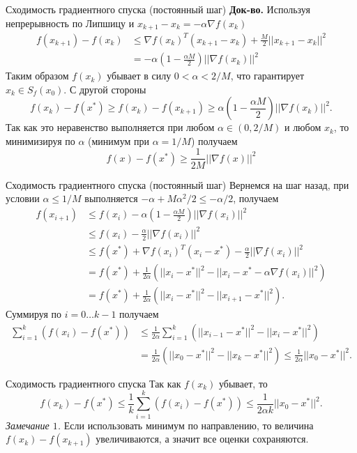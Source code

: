 \documentclass[10pt]{beamer}
\begin{document}
\begin{frame}{Сходимость градиентного спуска (постоянный шаг)}
\textbf{Док-во.} Используя непрерывность по Липшицу и $x_{k+1}-x_k=-\alpha \nabla f(x_k)$
\begin{align*}
f(x_{k+1})-f(x_k)&\leq \nabla f(x_k)^T(x_{k+1}-x_k)+\frac{M}{2}||x_{k+1}-x_k||^2\\
&=-\alpha\left(1-\frac{\alpha M}{2}\right)||\nabla f(x_k)||^2
\end{align*}
\pause
Таким образом $f(x_k)$ убывает в силу $0<\alpha<2/M$, что гарантирует $x_k\in S_f(x_0)$. \pause С другой стороны
$$
f(x_k)-f(x^*)\geq f(x_k)-f(x_{k+1})\geq \alpha\left(1-\frac{\alpha M}{2}\right)||\nabla f(x_k)||^2.
$$
Так как это неравенство выполняется при любом $\alpha\in(0, 2/M)$ и любом $x_k$, то минимизируя по $\alpha$ (минимум при $\alpha=1/M$) получаем
\begin{equation}\label{funcgeqgrad}
f(x)-f(x^*)\geq \frac{1}{2M}||\nabla f(x)||^2
\end{equation}
\end{frame}


\begin{frame}{Сходимость градиентного спуска (постоянный шаг)}
Вернемся на шаг назад, при условии $\alpha\leq 1/M$ выполняется $-\alpha+M\alpha^2/2\leq -\alpha/2$, получаем
\begin{align*}
f(x_{i+1}) & \leq f(x_i)-\alpha\left(1-\frac{\alpha M}{2}\right)||\nabla f(x_i)||^2 \\
& \leq f(x_i)-\frac{\alpha}{2}||\nabla f(x_i)||^2 \\
& \leq f(x^*)+\nabla f(x_i)^T(x_i-x^*)-\frac{\alpha}{2}||\nabla f(x_i)||^2 \\
& =f(x^*)+\frac{1}{2\alpha}\left(||x_i-x^*||^2-||x_i-x^*-\alpha \nabla f(x_i)||^2\right) \\
&=
f(x^*)+\frac{1}{2\alpha}\left(||x_i-x^*||^2-||x_{i+1}-x^*||^2\right).
\end{align*}
\pause
Суммируя по $i=0\ldots k-1$ получаем
\begin{align*}
\sum_{i=1}^k(f(x_i)-f(x^*)) & \leq \frac{1}{2\alpha}
\sum_{i=1}^k\left(||x_{i-1}-x^*||^2-||x_i-x^*||^2\right)\\
& =\frac{1}{2\alpha}\left(||x_0-x^*||^2-||x_k-x^*||^2\right)\leq \frac{1}{2\alpha}||x_0-x^*||^2. 
\end{align*}
\end{frame}

\begin{frame}{Сходимость градиентного спуска}
Так как $f(x_k)$ убывает, то
$$
f(x_k)-f(x^*)\leq \frac{1}{k}\sum_{i=1}^k(f(x_i)-f(x^*))\leq \frac{1}{2\alpha k}||x_0-x^*||^2.
$$
\pause
\textit{Замечание $1$.} Если использовать минимум по направлению, то величина $f(x_k)-f(x_{k+1})$ увеличиваются,
а значит все оценки сохраняются.\\
\end{frame}
\end{document}
